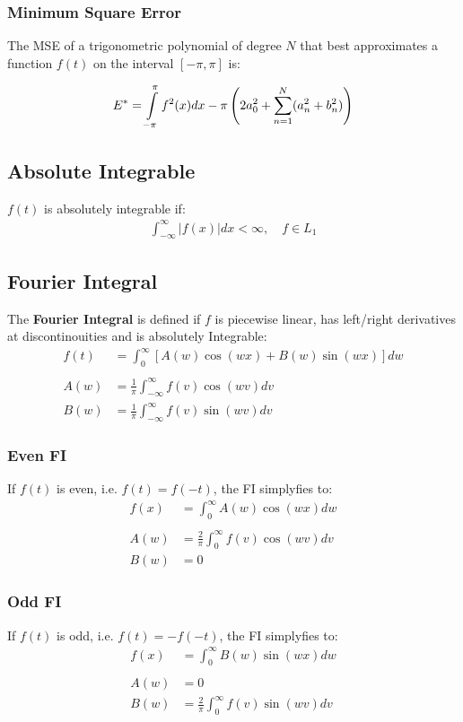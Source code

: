 \subsubsection{Minimum Square Error}
The MSE of a trigonometric polynomial of degree $N$ that best approximates a function $f(t)$ on the interval $[-\pi,\pi]$ is:

\begin{align*}
    E^*=\intop_{-\pi}^\pi f^2(x)dx-\pi\left(2a_0^2+\sum_{n=1}^N(a_n^2+b_n^2)\right)
\end{align*}

\subsection{Absolute Integrable}
$f(t)$ is absolutely integrable if:
\begin{align*}
    \int_{-\infty}^{\infty}\left|f(x)\right|dx<\infty ,\quad f\in L_1
\end{align*}
\subsection{Fourier Integral}
The \textbf{Fourier Integral} is defined if $f$ is piecewise linear, has left/right derivatives at
discontinouities and is absolutely Integrable:
\begin{align*}
    f(t) & =\int_0^\infty[A(w)\cos(wx)+B(w)\sin(wx)]dw     \\\\
    A(w) & =\frac1\pi\int_{-\infty}^{\infty}f(v)\cos(wv)dv \\
    B(w) & =\frac1\pi\int_{-\infty}^{\infty}f(v)\sin(wv)dv
\end{align*}

\subsubsection{Even FI}
If $f(t)$ is even, i.e. $f(t)=f(-t)$, the FI simplyfies to:
\begin{align*}
    f(x) & =\int_0^\infty A(w)\cos(wx)dw          \\\\
    A(w) & =\frac2\pi\int_0^\infty f(v)\cos(wv)dv \\
    B(w) & =0
\end{align*}
\subsubsection{Odd FI}
If $f(t)$ is odd, i.e. $f(t)=-f(-t)$, the FI simplyfies to:
\begin{align*}
    f(x) & =\int_0^\infty B(w)\sin(wx)dw          \\\\
    A(w) & =0                                     \\
    B(w) & =\frac2\pi\int_0^\infty f(v)\sin(wv)dv
\end{align*}

